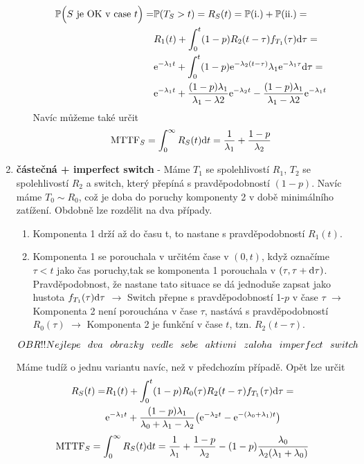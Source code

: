 \begin{enumerate}
\begin{enumerate}
\begin{align*}
 \mathbb{P}\Big(S\mathrm{~je~OK~v~case~}t \Big) =  & \mathbb{P}(T_S > t ) = R_S(t) = \mathbb{P}(\mathrm{i.}) + \mathbb{P}(\mathrm{ii.}) = \\ &
  R_1(t) + \int_0^t (1-p)R_2(t-\tau) f_{T_1}(\tau)\mathrm{d}\tau = \\ &
 \mathrm{e}^{-\lambda_1 t} + \int_0^t (1-p)\mathrm{e}^{-\lambda_2 (t-\tau)} \lambda_1\mathrm{e}^{-\lambda_1 \tau}  \mathrm{d}\tau = \\ &
 \mathrm{e}^{-\lambda_1 t} + \frac{(1-p)\lambda_1}{\lambda_1-\lambda2}\mathrm{e}^{-\lambda_2 t} - \frac{(1-p)\lambda_1}{\lambda_1-\lambda2}\mathrm{e}^{-\lambda_1 t}
 \end{align*}
Navíc můžeme také určit 
\begin{align*}
	\mathrm{MTTF}_S = \int_0^{\infty} R_S(t) \mathrm{d} t = \frac{1}{\lambda_1} + \frac{1-p}{\lambda_2}
	\end{align*}
	\end{enumerate}
	\item \textbf{částečná + imperfect switch} - Máme $T_1$ se spolehlivostí $R_1$, $T_2$ se spolehlivostí $R_2$ a switch, který přepíná s pravděpodobností $(1-p)$. Navíc máme $T_0 \sim R_0$, což je doba do poruchy komponenty 2 v době minimálního zatížení. Obdobně lze rozdělit na dva případy.
		\begin{enumerate}
			\item Komponenta 1 drží až do času t, to nastane s pravděpodobností $R_1(t)$.
			\item Komponenta 1 se porouchala v určitém čase v $(0,t)$, když označíme $\tau < t$ jako čas poruchy,tak se komponenta 1 porouchala v $(\tau,\tau + \mathrm{d}\tau)$. Pravděpodobnost, že nastane tato situace se dá jednoduše zapsat jako hustota $f_{T_1}(\tau)\mathrm{d}\tau$ $\longrightarrow$ Switch přepne s pravděpodobností 1-$p$ v čase $\tau$ $\longrightarrow$ Komponenta 2 není porouchána v čase $\tau$, nastává s pravděpodobností $R_0(\tau)$ $\longrightarrow$ Komponenta 2 je funkční v čase $t$, tzn. $R_2(t-\tau)$.
		\end{enumerate}
	
$$\Huge{OBR!!Nejlepe~dva~obrazky~vedle~sebe~aktivni~zaloha~imperfect~switch}	$$

	Máme tudíž o jednu variantu navíc, než v předchozím případě. Opět lze určit 
	\begin{align*}
		 R_S(t) = &	R_1(t) + \int_0^t (1-p)R_0(\tau)R_2(t-\tau) f_{T_1}(\tau)\mathrm{d}\tau = \\ &
		\mathrm{e}^{-\lambda_1 t} + \frac{(1-p)\lambda_1}{\lambda_0+\lambda_1-\lambda_2}\big(\mathrm{e}^{-\lambda_2 t} - \mathrm{e}^{-(\lambda_0 + \lambda_1) t} \big)
	\end{align*}
\begin{align*}
	\mathrm{MTTF}_S = \int_0^{\infty} R_S(t) \mathrm{d} t = \frac{1}{\lambda_1} + \frac{1-p}{\lambda_2} - (1-p)\frac{\lambda_0}{\lambda_2(\lambda_1 + \lambda_0)}
\end{align*}
\end{enumerate}




